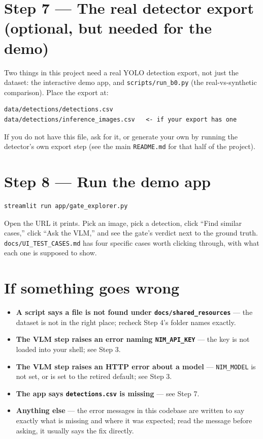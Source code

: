 \documentclass[11pt,a4paper]{article}
\begin{document}
\section{Step 7 --- The real detector export (optional, but needed for the demo)}

Two things in this project need a real YOLO detection export, not just the
dataset: the interactive demo app, and \texttt{scripts/run\_b0.py} (the
real-vs-synthetic comparison). Place the export at:

\begin{verbatim}
data/detections/detections.csv
data/detections/inference_images.csv   <- if your export has one
\end{verbatim}

If you do not have this file, ask for it, or generate your own by running
the detector's own export step (see the main \texttt{README.md} for that
half of the project).

\section{Step 8 --- Run the demo app}

\begin{verbatim}
streamlit run app/gate_explorer.py
\end{verbatim}

Open the URL it prints. Pick an image, pick a detection, click ``Find
similar cases,'' click ``Ask the VLM,'' and see the gate's verdict next to
the ground truth. \texttt{docs/UI\_TEST\_CASES.md} has four specific cases
worth clicking through, with what each one is supposed to show.

\section{If something goes wrong}

\begin{itemize}[nosep]
  \item \textbf{A script says a file is not found under \texttt{docs/shared\_resources}} ---
    the dataset is not in the right place; recheck Step 4's folder names exactly.
  \item \textbf{The VLM step raises an error naming \texttt{NIM\_API\_KEY}} ---
    the key is not loaded into your shell; see Step 3.
  \item \textbf{The VLM step raises an HTTP error about a model} ---
    \texttt{NIM\_MODEL} is not set, or is set to the retired default; see Step 3.
  \item \textbf{The app says \texttt{detections.csv} is missing} --- see Step 7.
  \item \textbf{Anything else} --- the error messages in this codebase are
    written to say exactly what is missing and where it was expected; read
    the message before asking, it usually says the fix directly.
\end{itemize}
\end{document}
